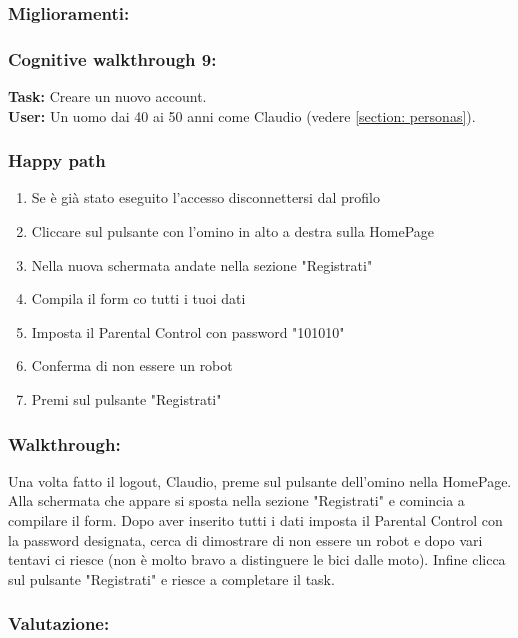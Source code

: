 \documentclass[../Report.tex]{subfiles}
\begin{document}
    \subsubsection{Miglioramenti:}

    \subsubsection{Cognitive walkthrough 9:}
    \textbf{Task:} Creare un nuovo account.\\
    \textbf{User:} Un uomo dai 40 ai 50 anni come Claudio (vedere \ref{section: personas}).\\

    \subsubsection{Happy path}
    \begin{enumerate}
        \item Se è già stato eseguito l'accesso disconnettersi dal profilo
        \item Cliccare sul pulsante con l’omino in alto a destra sulla HomePage
        \item Nella nuova schermata andate nella sezione "Registrati" 
        \item Compila il form co tutti i tuoi dati
        \item Imposta il Parental Control con password "101010"
        \item Conferma di non essere un robot
        \item Premi sul pulsante "Registrati"
    \end{enumerate}

    \subsubsection{Walkthrough:}
    Una volta fatto il logout, Claudio, preme sul pulsante dell'omino nella HomePage.
    Alla schermata che appare si sposta nella sezione "Registrati" e comincia a compilare il form. Dopo aver inserito tutti i dati imposta il Parental Control con la password designata, cerca di dimostrare di non essere un robot e dopo vari tentavi ci riesce (non è molto bravo a distinguere le bici dalle moto). Infine clicca sul pulsante "Registrati" e riesce a completare il task.
    \subsubsection{Valutazione:}
\end{document}
